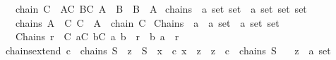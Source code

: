 \begin{isabellebody}
\ \ \ {\isachardoublequoteopen}chain\isactrlsub {\isasymsubseteq}\ C\ {\isasymlongleftrightarrow}\ {\isacharparenleft}{\kern0pt}{\isasymforall}A{\isasymin}C{\isachardot}{\kern0pt}\ {\isasymforall}B{\isasymin}C{\isachardot}{\kern0pt}\ A\ {\isasymsubseteq}\ B\ {\isasymor}\ B\ {\isasymsubseteq}\ A{\isacharparenright}{\kern0pt}{\isachardoublequoteclose}\isanewline
\isanewline
{}\isamarkupfalse%
\ chains\ {\isacharcolon}{\kern0pt}{\isacharcolon}{\kern0pt}\ {\isachardoublequoteopen}{\isacharprime}{\kern0pt}a\ set\ set\ {\isasymRightarrow}\ {\isacharprime}{\kern0pt}a\ set\ set\ set{\isachardoublequoteclose}\isanewline
\ \ \ {\isachardoublequoteopen}chains\ A\ {\isacharequal}{\kern0pt}\ {\isacharbraceleft}{\kern0pt}C{\isachardot}{\kern0pt}\ C\ {\isasymsubseteq}\ A\ {\isasymand}\ chain\isactrlsub {\isasymsubseteq}\ C{\isacharbraceright}{\kern0pt}{\isachardoublequoteclose}\isanewline
\isanewline
{}\isamarkupfalse%
\ Chains\ {\isacharcolon}{\kern0pt}{\isacharcolon}{\kern0pt}\ {\isachardoublequoteopen}{\isacharparenleft}{\kern0pt}{\isacharprime}{\kern0pt}a\ {\isasymtimes}\ {\isacharprime}{\kern0pt}a{\isacharparenright}{\kern0pt}\ set\ {\isasymRightarrow}\ {\isacharprime}{\kern0pt}a\ set\ set{\isachardoublequoteclose}\ \ \isanewline
\ \ \ {\isachardoublequoteopen}Chains\ r\ {\isacharequal}{\kern0pt}\ {\isacharbraceleft}{\kern0pt}C{\isachardot}{\kern0pt}\ {\isasymforall}a{\isasymin}C{\isachardot}{\kern0pt}\ {\isasymforall}b{\isasymin}C{\isachardot}{\kern0pt}\ {\isacharparenleft}{\kern0pt}a{\isacharcomma}{\kern0pt}\ b{\isacharparenright}{\kern0pt}\ {\isasymin}\ r\ {\isasymor}\ {\isacharparenleft}{\kern0pt}b{\isacharcomma}{\kern0pt}\ a{\isacharparenright}{\kern0pt}\ {\isasymin}\ r{\isacharbraceright}{\kern0pt}{\isachardoublequoteclose}\isanewline
\isanewline
{}\isamarkupfalse%
\ chains{\isacharunderscore}{\kern0pt}extend{\isacharcolon}{\kern0pt}\ {\isachardoublequoteopen}c\ {\isasymin}\ chains\ S\ {\isasymLongrightarrow}\ z\ {\isasymin}\ S\ {\isasymLongrightarrow}\ {\isasymforall}x\ {\isasymin}\ c{\isachardot}{\kern0pt}\ x\ {\isasymsubseteq}\ z\ {\isasymLongrightarrow}\ {\isacharbraceleft}{\kern0pt}z{\isacharbraceright}{\kern0pt}\ {\isasymunion}\ c\ {\isasymin}\ chains\ S{\isachardoublequoteclose}\isanewline
\ \ \ z\ {\isacharcolon}{\kern0pt}{\isacharcolon}{\kern0pt}\ {\isachardoublequoteopen}{\isacharprime}{\kern0pt}a\ set{\isachardoublequoteclose}\isanewline
%
\isadelimproof
\ \ %
\endisadelimproof
%
\isatagproof
{}\isamarkupfalse%

\end{isabellebody}
